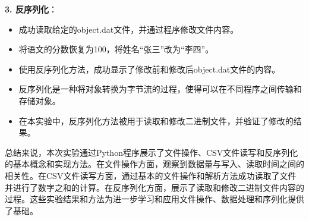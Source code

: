 \documentclass[lang=cn,11pt,a4paper]{elegantpaper}
\begin{document}
\textbf{3. 反序列化}：
\begin{itemize}
   \item 成功读取给定的object.dat文件，并通过程序修改文件内容。
   \item 将语文的分数恢复为100，将姓名“张三”改为“李四”。
   \item 使用反序列化方法，成功显示了修改前和修改后object.dat文件的内容。
   \item 反序列化是一种将对象转换为字节流的过程，使得可以在不同程序之间传输和存储对象。
   \item 在本实验中，反序列化方法被用于读取和修改二进制文件，并验证了修改的结果。
\end{itemize}

总结来说，本次实验通过Python程序展示了文件操作、CSV文件读写和反序列化的基本概念和实现方法。在文件操作方面，观察到数据量与写入、读取时间之间的相关性。在CSV文件读写方面，通过基本的文件操作和解析方法成功读取了文件并进行了数字之和的计算。在反序列化方面，展示了读取和修改二进制文件内容的过程。这些实验结果和方法为进一步学习和应用文件操作、数据处理和序列化提供了基础。





\end{document}
